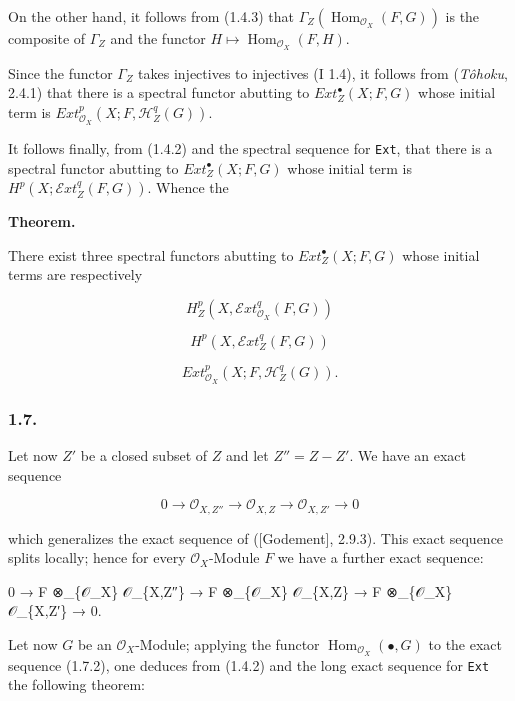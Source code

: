 \documentclass[
]{article}
\newenvironment{Shaded}{}{}
\newcommand{\NormalTok}[1]{#1}
\begin{document}
On the other hand, it follows from (1.4.3) that
\(\Gamma_{Z}(\operatorname{Hom}_{\mathcal{O}_{X}}(F, G))\) is the
composite of \(\Gamma_{Z}\) and the functor
\(H \mapsto \operatorname{Hom}_{\mathcal{O}_{X}}(F, H)\).

Since the functor \(\Gamma_{Z}\) takes injectives to injectives (I 1.4),
it follows from (\emph{Tôhoku}, 2.4.1) that there is a spectral functor
abutting to \(Ext^{\bullet}_{Z}(X; F, G)\) whose initial term is
\(Ext^{p}_{\mathcal{O}_{X}}(X; F, \mathcal{H}^{q}_{Z}(G))\).

It follows finally, from (1.4.2) and the spectral sequence for
\texttt{Ext}, that there is a spectral functor abutting to
\(Ext^{\bullet}_{Z}(X; F, G)\) whose initial term is
\(H^{p}(X; \mathcal{E}xt^{q}_{Z}(F, G))\). Whence the

\textbf{Theorem.}

There exist three spectral functors abutting to
\(Ext^{\bullet}_{Z}(X; F, G)\) whose initial terms are respectively

\[
H^{p}_{Z}(X, \mathcal{E}xt^{q}_{\mathcal{O}_{X}}(F, G))
\]

\[
H^{p}(X, \mathcal{E}xt^{q}_{Z}(F, G))
\]

\[
Ext^{p}_{\mathcal{O}_{X}}(X; F, \mathcal{H}^{q}_{Z}(G)).
\]

\subsubsection{1.7.}\label{section-3}

Let now \(Z'\) be a closed subset of \(Z\) and let \(Z'' = Z - Z'\). We
have an exact sequence

\[
0 \to \mathcal{O}_{X,Z''} \to \mathcal{O}_{X,Z} \to \mathcal{O}_{X,Z'} \to 0
\]

which generalizes the exact sequence of ({[}Godement{]}, 2.9.3). This
exact sequence splits locally; hence for every
\(\mathcal{O}_{X}\)-Module \(F\) we have a further exact sequence:

\begin{Shaded}
\begin{Highlighting}[]
\NormalTok{0 → F ⊗\_\{𝒪\_X\} 𝒪\_\{X,Z″\} → F ⊗\_\{𝒪\_X\} 𝒪\_\{X,Z\} → F ⊗\_\{𝒪\_X\} 𝒪\_\{X,Z′\} → 0.}
\end{Highlighting}
\end{Shaded}

Let now \(G\) be an \(\mathcal{O}_{X}\)-Module; applying the functor
\(\operatorname{Hom}_{\mathcal{O}_{X}}(\bullet, G)\) to the exact
sequence (1.7.2), one deduces from (1.4.2) and the long exact sequence
for \texttt{Ext} the following theorem:
\end{document}
